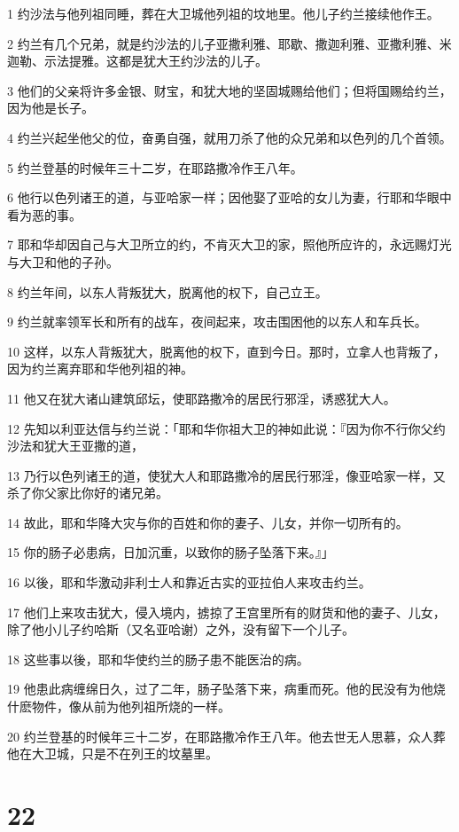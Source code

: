\par 1 约沙法与他列祖同睡，葬在大卫城他列祖的坟地里。他儿子约兰接续他作王。
\par 2 约兰有几个兄弟，就是约沙法的儿子亚撒利雅、耶歇、撒迦利雅、亚撒利雅、米迦勒、示法提雅。这都是犹大王约沙法的儿子。
\par 3 他们的父亲将许多金银、财宝，和犹大地的坚固城赐给他们；但将国赐给约兰，因为他是长子。
\par 4 约兰兴起坐他父的位，奋勇自强，就用刀杀了他的众兄弟和以色列的几个首领。
\par 5 约兰登基的时候年三十二岁，在耶路撒冷作王八年。
\par 6 他行以色列诸王的道，与亚哈家一样；因他娶了亚哈的女儿为妻，行耶和华眼中看为恶的事。
\par 7 耶和华却因自己与大卫所立的约，不肯灭大卫的家，照他所应许的，永远赐灯光与大卫和他的子孙。
\par 8 约兰年间，以东人背叛犹大，脱离他的权下，自己立王。
\par 9 约兰就率领军长和所有的战车，夜间起来，攻击围困他的以东人和车兵长。
\par 10 这样，以东人背叛犹大，脱离他的权下，直到今日。那时，立拿人也背叛了，因为约兰离弃耶和华他列祖的神。
\par 11 他又在犹大诸山建筑邱坛，使耶路撒冷的居民行邪淫，诱惑犹大人。
\par 12 先知以利亚达信与约兰说：「耶和华你祖大卫的神如此说：『因为你不行你父约沙法和犹大王亚撒的道，
\par 13 乃行以色列诸王的道，使犹大人和耶路撒冷的居民行邪淫，像亚哈家一样，又杀了你父家比你好的诸兄弟。
\par 14 故此，耶和华降大灾与你的百姓和你的妻子、儿女，并你一切所有的。
\par 15 你的肠子必患病，日加沉重，以致你的肠子坠落下来。』」
\par 16 以後，耶和华激动非利士人和靠近古实的亚拉伯人来攻击约兰。
\par 17 他们上来攻击犹大，侵入境内，掳掠了王宫里所有的财货和他的妻子、儿女，除了他小儿子约哈斯（又名亚哈谢）之外，没有留下一个儿子。
\par 18 这些事以後，耶和华使约兰的肠子患不能医治的病。
\par 19 他患此病缠绵日久，过了二年，肠子坠落下来，病重而死。他的民没有为他烧什麽物件，像从前为他列祖所烧的一样。
\par 20 约兰登基的时候年三十二岁，在耶路撒冷作王八年。他去世无人思慕，众人葬他在大卫城，只是不在列王的坟墓里。

\chapter{22}

